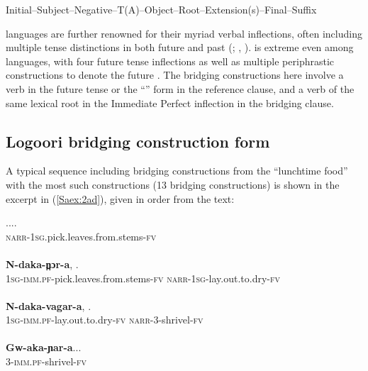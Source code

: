 \documentclass[output=paper]{LSP/langsci}
\begin{document}
\begin{exe}
	\ex	\label{Saex:2}
 {\citep[after][90]{Nurse2003}}
\glt	Initial--Subject--Negative--T(A)--Object--Root--Extension(s)--Final--Suffix
\end{exe}


 languages are further renowned for their myriad verbal inflections, often including multiple tense distinctions in both future and past (\citealt{Botne2008}; \citealt{Nurse2003}, \citealt{Nurse2008}).  is extreme even among  languages, with four future tense inflections as well as multiple periphrastic constructions to denote the future \citep{Sarvasy2016}. The  bridging constructions here involve a verb in the future tense or the ``'' form in the reference clause, and a verb of the same lexical root in the Immediate Perfect inflection in the bridging clause. 
%
\subsection{Logoori bridging construction form}
\label{Sa21form}
A typical sequence including bridging constructions from the  ``lunchtime food'' \citep{Chesi2014} with the most such constructions (13 bridging constructions) is shown in the excerpt in (\ref{Saex:2ad}), given in order from the text:


\begin{exe}
\ex \label{Saex:2ad}
\begin{xlist}
\ex \label{Saex:2a}
\gll ...\underline{}.\\
\textsc{narr}-\textsc{1sg.}pick.leaves.from.stems\textsc{-fv}\\
\glt {}\\
\ex \label{Saex:2b}
\gll \textbf{N-daka-n̪ɔr-a},          \underline{}.\\
\textsc{1sg}-\textsc{imm.pf-}pick.leaves.from.stems-\textsc{fv}  \textsc{narr}-\textsc{1sg}-lay.out.to.dry-\textsc{fv}\\
\glt {}\\
\ex \label{Saex:2c}
\gll \textbf{N-daka-vagar-a},      \underline{}.\\
\textsc{1sg-imm.pf-}lay.out.to.dry-\textsc{fv}  \textsc{narr}-\textsc{3}-shrivel-\textsc{fv}\\
\glt {}\\
\ex \label{Saex:2d}
\gll \textbf{Gw-aka-ɲar-a}...\\     	       
    \textsc{3}-\textsc{imm.pf-}shrivel-\textsc{fv}\\
\glt {} 
\end{xlist}
\end{exe}
\end{document}
